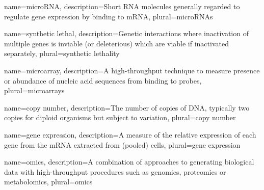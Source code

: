 






{
  name=microRNA,
  description={Short RNA molecules generally regarded to regulate gene expression by binding to mRNA},
  plural=microRNAs
}

{
  name=synthetic lethal,
  description={Genetic interactions where inactivation of multiple genes is inviable (or deleterious) which are viable if inactivated separately},
  plural=synthetic lethality
}

{
  name=microarray,
  description={A high-throughput technique to measure presence or abundance of nucleic acid sequences from binding to probes},
  plural=microarrays
}

{
  name=copy number,
  description={The number of copies of DNA, typically two copies for diploid organisms but subject to variation},
  plural=copy number
}

{
  name=gene expression,
  description={A measure of the relative expression of each gene from the mRNA extracted from (pooled) cells},
  plural=gene expression
}

{
  name=omics,
  description={A combination of approaches to generating biological data with high-throughput procedures such as genomics, proteomics or metabolomics},
  plural=omics
}

